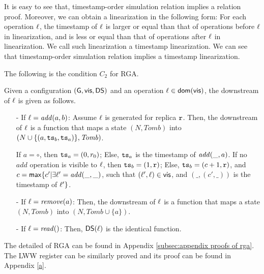 It is easy to see that, timestamp-order simulation relation implies a \crdtlinearizable{} relation proof. Moreover, we can obtain a linearization in the following form: For each operation $\alabel$, the timestamp of $\alabel$ is larger or equal than that of operations before $\alabel$ in linearization, and is less or equal than that of operations after $\alabel$ in linearization. We call such linearization a timestamp linearization. We can see that timestamp-order simulation relation implies a timestamp linearization.

The following is the condition $C_2$ for RGA. 

\begin{example}
\label{example:condition c2 for rga} 
Given a configuration $(\gstates, \avisord, \downstreams)$ and an operation $\alabel \in \dom{\avisord}$, the downstream of $\alabel$ is given as follows. 

\begin{itemize}
\setlength{\itemsep}{0.5pt}
\item[-] If $\alabel = \alabellongNoret[\mathit{add}]{a,b}$: Assume $\alabel$ is generated for replica $\arep$. Then, the downstream of $\alabel$ is a function that maps a state $(N,\mathit{Tomb})$ into $(N \cup \{ (a,\ats_b,\ats_a) \}, \mathit{Tomb})$. 
    
    If $a = \circ$, then $\ats_a = (0,r_0)$; Else, $\ats_a$ is the timestamp of $\alabellongNoret[\mathit{add}]{\_,a}$. If no $\mathit{add}$ operation is visible to $\alabel$, then $\ats_b = (1,\arep)$; Else, $\ats_b = (c+1,\arep)$, and $c = \mathsf{max}\{ c' \vert \exists \alabel' = \alabellongNoret[\mathit{add}]{\_,\_}$, such that $(\alabel', \alabel) \in \avisord$, and $(\_,(c',\_))$ is the timestamp of $\alabel' \}$. 


\item[-] If $\alabel = \alabellongNoret[\mathit{remove}]{\argv}$: Then, the downstream of $\alabel$ is a function that maps a state $(N,\mathit{Tomb})$ into $(N, \mathit{Tomb} \cup \{ a \})$.

\item[-] If $\alabel = \alabellongNoret[\mathit{read}]{}$: Then, $\downstreams(\alabel)$ is the identical function. 
\end{itemize} 
\end{example}

The detailed of RGA can be found in Appendix \ref{subsec:appendix proofs of rga}. The LWW register can be similarly proved and its proof can be found in Appendix \ref{a}.




